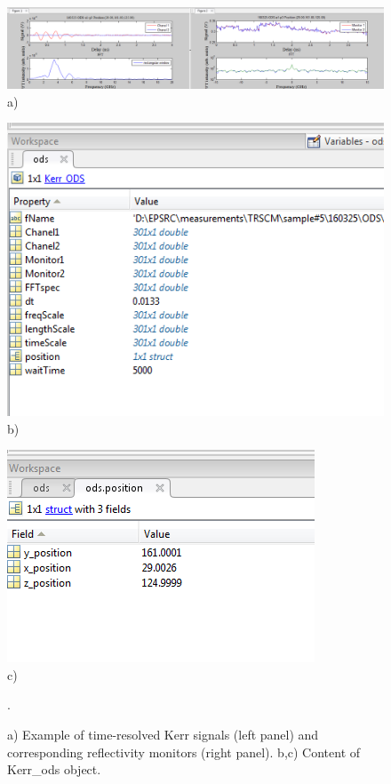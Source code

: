 \documentclass[14pt,a4paper] {article}
\begin{document}
\begin{enumerate}
\begin{figure}
\begin{minipage}{1\linewidth}
\includegraphics[width = 1\linewidth]{software1} \\a)
\end{minipage}
\vfill
\begin{minipage}{0.5\linewidth}
\includegraphics[width = 1\linewidth]{software2} \\b)
\end{minipage}
\begin{minipage}{0.5\linewidth}
\includegraphics[width = 1\linewidth]{software3} \\c)
\end{minipage}
\caption{a) Example of time-resolved Kerr signals (left panel) and corresponding reflectivity monitors (right panel). b,c) Content of Kerr_ods object.}.
\label{fig:software1}
\end{figure}


\end{enumerate}
\end{document}
